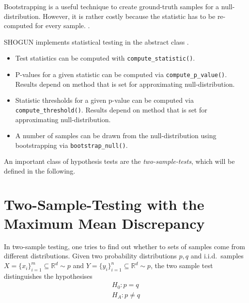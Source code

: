 Bootstrapping is a useful technique to create ground-truth samples for a null-distribution. However, it is rather costly because the statistic has to be re-computed for every sample. .

SHOGUN implements statistical testing in the abstract class .
\begin{itemize}
\item Test statistics can be computed with \texttt{compute\_statistic()}.
\item P-values for a given statistic can be computed via \texttt{compute\_p\_value()}. Results depend on method that is set for approximating null-distribution.
\item Statistic thresholds for a given p-value can be computed via \texttt{compute\_threshold()}. Results depend on method that is set for approximating null-distribution.
\item A number of samples can be drawn from the null-distribution using bootstrapping via \texttt{bootstrap\_null()}.
\end{itemize}

An important class of hypothesis tests are the \emph{two-sample-tests}, which will be defined in the following.

\section{Two-Sample-Testing with the Maximum Mean Discrepancy}
\label{sec:mmd_into}
In two-sample testing, one tries to find out whether to sets of samples come from different distributions. Given two probability distributions $p,q$ and i.i.d.\ samples $X=\{x_i\}_{i=1}^m\subseteq \mathbb{R}^d\sim p$ and $Y=\{y_i\}_{i=1}^n\subseteq \mathbb{R}^d\sim p$, the two sample test distinguishes the hypothesises
\begin{align*}
H_0: p=q\\
H_A: p\neq q
\end{align*}

